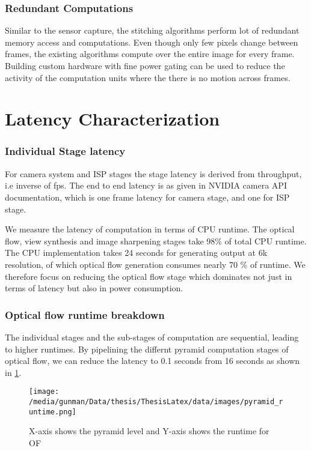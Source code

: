 \subsubsection{Redundant Computations}
Similar to the sensor capture, the stitching algorithms perform lot of redundant memory access and computations. Even though only few pixels change between frames, the existing algorithms compute over the entire image for every frame. Building custom hardware with fine power gating can be used to reduce the activity of the computation units where the there is no motion across frames. 



\section{Latency Characterization}

\subsubsection{Individual Stage latency}


For camera system and ISP stages the stage latency is derived from throughput, i.e inverse of fps. The end to end latency is as given in NVIDIA camera API documentation, which is one frame latency for camera stage, and one for ISP stage. 

We measure the latency of computation in terms of CPU runtime. The optical flow, view synthesis and image sharpening stages take 98\% of total CPU runtime. The CPU  implementation takes 24 seconds for generating output at 6k resolution, of which optical flow generation consumes nearly 70 \% of runtime. We therefore focus on reducing the optical flow stage which dominates not just in terms of latency but also in power consumption. 


\subsubsection{Optical flow runtime breakdown}
The individual stages and the sub-stages of computation are sequential, leading to higher runtimes. By pipelining the differnt pyramid computation stages of optical flow, we can reduce the latency to 0.1 seconds from 16 seconds as shown in \ref{fig:OF_pyr_runtime}.

\begin{figure}[h]
	\begin{center}
		\texttt{[image: /media/gunman/Data/thesis/ThesisLatex/data/images/pyramid\_runtime.png]}

	\end{center}
		\caption{X-axis shows the pyramid level and Y-axis shows the runtime for OF}
\label{fig:OF_pyr_runtime}
\end{figure} 

